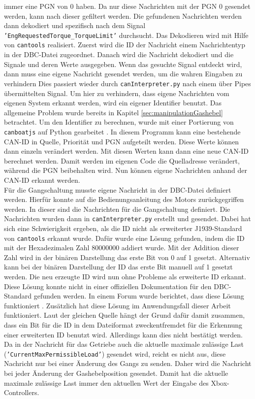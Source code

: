 immer eine PGN von 0 haben. Da nur diese Nachrichten
mit der PGN 0 gesendet werden, kann nach dieser gefiltert werden. Die gefundenen Nachrichten werden dann dekodiert und
spezifisch nach
dem Signal \texttt{'EngRequestedTorque\_TorqueLimit'} durchsucht. 
Das Dekodieren wird mit Hilfe von \texttt{cantools} realisiert. Zuerst wird die ID der Nachricht einem Nachrichtentyp in der DBC-Datei
zugeordnet. Danach wird die Nachricht dekodiert und die Signale und deren Werte ausgegeben.
Wenn das gesuchte Signal entdeckt wird, dann muss eine eigene Nachricht
gesendet werden, um die wahren Eingaben zu verhindern
Dies passiert wieder durch \texttt{canInterpreter.py} nach 
einem über Pipes übermittelten Signal. Um hier zu verhindern, dass eigene Nachrichten vom eigenen System erkannt werden,
wird ein eigener Identifier benutzt. Das allgemeine Problem wurde bereits in Kapitel \ref{sec:manipulationGashebel}
betrachtet.
Um den Identifier zu berechnen, wurde mit einer Portierung von \texttt{canboatjs} auf Python gearbeitet 
\cite{canboatjs}. 
In diesem Programm kann eine bestehende CAN-ID in Quelle, Priorität und PGN aufgeteilt werden. Diese Werte können dann
einzeln verändert werden. Mit diesen Werten kann dann eine neue CAN-ID berechnet werden. 
Damit werden im eigenen Code die Quelladresse verändert, während die PGN beibehalten wird.
Nun können eigene Nachrichten 
anhand der CAN-ID erkannt werden.\\
Für die Gangschaltung musste eigene Nachricht in der DBC-Datei definiert werden. Hierfür konnte auf die Bedienungsanleitung
des Motors zurückgegriffen werden. In dieser sind die Nachrichten für die Gangschaltung definiert.
Die Nachrichten wurden dann in \texttt{canInterpreter.py} erstellt und gesendet.
Dabei hat sich eine Schwierigkeit ergeben, als die ID nicht als erweiterter J1939-Standard von \texttt{cantools} erkannt wurde. 
Dafür wurde eine Lösung gefunden, indem die ID mit der Hexadezimalen Zahl 80000000 addiert wurde. Mit der Addition dieser Zahl
wird in der binären Darstellung das erste Bit von 0 auf 1 gesetzt. Alternativ kann bei der binären Darstellung der ID das erste Bit
manuell auf 1 gesetzt werden. Die neu erzeugte ID
wird nun ohne Probleme als erweiterte ID erkannt. Diese Lösung konnte nicht in einer offiziellen Dokumentation für den
DBC-Standard gefunden werden. In einem Forum wurde berichtet, dass diese Lösung funktioniert \cite{cantoolsIssue}. 
Zusätzlich hat diese Lösung im Anwendungsfall dieser Arbeit funktioniert. 
Laut der gleichen Quelle hängt der Grund dafür damit zusammen, dass ein Bit für die ID in dem Dateiformat zweckentfremdet für
die Erkennung einer erweiterten ID benutzt wird. Allerdings kann dies nicht bestätigt werden. \\
Da in der Nachricht für das Getriebe auch die aktuelle maximale zulässige Last (\texttt{'CurrentMaxPermissibleLoad'}) gesendet wird, 
reicht es nicht aus, diese
Nachricht nur bei einer Änderung des Gangs zu senden. Daher wird die Nachricht bei jeder Änderung der Gashebelposition
gesendet. Damit hat die aktuelle maximale zulässige Last immer den aktuellen Wert der Eingabe des Xbox-Controllers.